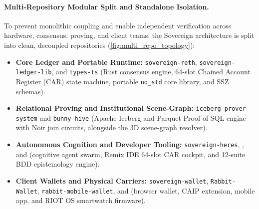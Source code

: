 \documentclass[a4paper,11pt,twoside,parskip=half-,headings=small]{scrartcl}
\newcommand{\code}[1]{\texttt{#1}}
\begin{document}
\paragraph{Multi-Repository Modular Split and Standalone Isolation.}
To prevent monolithic coupling and enable independent verification across hardware, consensus, proving, and client teams, the Sovereign architecture is split into clean, decoupled repositories (\cref{fig:multi_repo_topology}):
\begin{itemize}[nosep]
  \item \textbf{Core Ledger and Portable Runtime:} \code{sovereign-reth}, \code{sovereign-ledger-lib}, and \code{types-ts} (Rust consensus engine, 64-slot Chained Account Register (CAR) state machine, portable \code{no\_std} core library, and SSZ schemas).
  \item \textbf{Relational Proving and Institutional Scene-Graph:} \code{iceberg-prover-system} and \code{bunny-hive} (Apache Iceberg and Parquet Proof of SQL engine with Noir join circuits, alongside the 3D scene-graph resolver).
  \item \textbf{Autonomous Cognition and Developer Tooling:} \code{sovereign-heres}, , and  (cognitive agent swarm, Remix IDE 64-slot CAR cockpit, and 12-suite BDD epistemology engine).
  \item \textbf{Client Wallets and Physical Carriers:} \code{sovereign-wallet}, \code{Rabbit-Wallet}, \code{rabbit-mobile-wallet}, and  (browser wallet, CAIP extension, mobile app, and RIOT OS smartwatch firmware).
\end{itemize}
\end{document}

